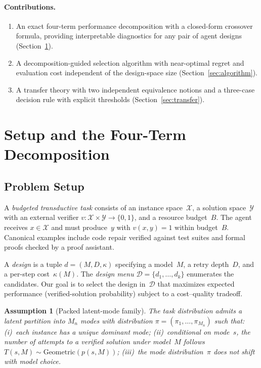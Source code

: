 \documentclass[11pt]{article}
\newtheorem{assumption}{Assumption}
\newcommand{\cD}{\mathcal{D}}
\newcommand{\cX}{\mathcal{X}}
\newcommand{\cY}{\mathcal{Y}}
\newcommand{\Mn}{M_n}
\begin{document}
\paragraph{Contributions.}
\begin{enumerate}
\item An exact four-term performance decomposition with a closed-form
  crossover formula, providing interpretable diagnostics for any pair of
  agent designs (Section~\ref{sec:decomposition}).
\item A decomposition-guided selection algorithm with near-optimal regret
  and evaluation cost independent of the design-space size
  (Section~\ref{sec:algorithm}).
\item A transfer theory with two independent equivalence notions and a
  three-case decision rule with explicit thresholds
  (Section~\ref{sec:transfer}).
\end{enumerate}



\section{Setup and the Four-Term Decomposition}
\label{sec:decomposition}

\subsection{Problem Setup}
\label{sec:setup}

A \emph{budgeted transductive task} consists of an instance space~$\cX$,
a solution space~$\cY$ with an external verifier
$v\colon \cX \times \cY \to \{0,1\}$, and a resource budget~$B$.
The agent receives $x \in \cX$ and must produce~$y$ with $v(x,y)=1$
within budget~$B$.  Canonical examples include code repair verified against
test suites and formal proofs checked by a proof assistant.

A \emph{design} is a tuple $d = (M, D, \kappa)$ specifying a model~$M$,
a retry depth~$D$, and a per-step cost~$\kappa(M)$.  The \emph{design
menu} $\cD = \{d_1,\ldots,d_k\}$ enumerates the candidates.  Our goal is
to select the design in~$\cD$ that maximizes expected performance
(verified-solution probability) subject to a cost--quality tradeoff.

\begin{assumption}[Packed latent-mode family]
\label{ass:packed}
The task distribution admits a latent partition into $\Mn$ modes
with distribution $\pi = (\pi_1,\ldots,\pi_{\Mn})$ such that:
(i)~each instance has a unique dominant mode;
(ii)~conditional on mode~$s$, the number of attempts to a verified
solution under model~$M$ follows
$T(s,M) \sim \mathrm{Geometric}(p(s,M))$;
(iii)~the mode distribution~$\pi$ does not shift with model choice.
\end{assumption}
\end{document}
